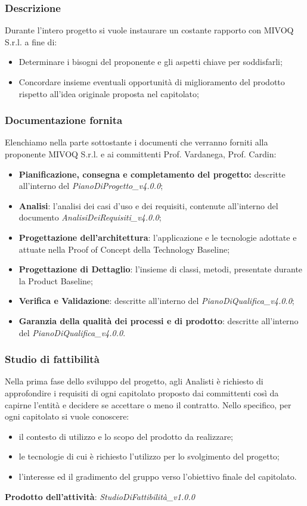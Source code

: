 \documentclass[11pt,a4paper]{article}
\begin{document}
{	\subsubsection{Descrizione}
	Durante l’intero progetto si vuole instaurare un costante rapporto con MIVOQ S.r.l. a fine di:
	\begin{itemize}
		\item Determinare i bisogni del proponente e gli aspetti chiave per soddisfarli;
		\item Concordare insieme eventuali opportunità di miglioramento del prodotto rispetto all'idea originale proposta nel capitolato;
	\end{itemize}
	
	\subsubsection{Documentazione fornita}
	Elenchiamo nella parte sottostante i documenti che verranno forniti alla proponente MIVOQ S.r.l. e ai committenti Prof. Vardanega, Prof. Cardin: 
	\begin{itemize}
	\item \textbf{Pianificazione, consegna e completamento del progetto:} descritte all’interno del \textit{PianoDiProgetto\_v4.0.0};
	\item \textbf{Analisi}: l’analisi dei casi d’uso e dei requisiti, contenute all’interno del documento \textit{AnalisiDeiRequisiti\_v4.0.0};
	\item \textbf{Progettazione dell’architettura}: l’applicazione e le tecnologie
	adottate e attuate nella Proof of Concept della Technology Baseline;
	\item\textbf{ Progettazione di Dettaglio}: l’insieme di classi, metodi, presentate durante la Product Baseline;
	\item \textbf{Verifica e Validazione}: descritte all’interno del \textit{PianoDiQualifica\_v4.0.0};
	\item \textbf{Garanzia della qualità dei processi e di prodotto}: descritte all’interno del \textit{PianoDiQualifica\_v4.0.0}.
	\end{itemize}
	
	\subsubsection{Studio di fattibilità}
	Nella prima fase dello sviluppo del progetto, agli Analisti è richiesto di approfondire i requisiti di ogni capitolato proposto dai committenti così da capirne l'entità e decidere se accettare o meno il contratto. Nello specifico, per ogni capitolato si vuole conoscere:
	\begin{itemize}
		\item il contesto di utilizzo e lo scopo del prodotto da realizzare;
		\item le tecnologie di cui è richiesto l'utilizzo per lo svolgimento del progetto;
		\item l'interesse ed il gradimento del gruppo verso l'obiettivo finale del capitolato.
	\end{itemize}
	\textbf{Prodotto dell'attività}: \textit{StudioDiFattibilità\_v1.0.0}
	
}
\end{document}
